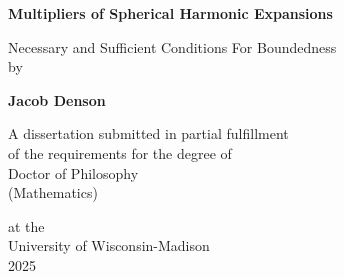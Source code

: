 \begin{titlepage}
    \begin{center}
        \vspace*{1cm}
        
        \Huge
        \textbf{Multipliers of Spherical Harmonic Expansions}
        
        \vspace{0.5cm}
        \LARGE
        {Necessary and Sufficient Conditions For Boundedness}%
        \vspace{1em}
        \\
        by\\
        \vspace{1em}
    
        \textbf{Jacob Denson}
        
        \vfill
        
        A dissertation submitted in partial fulfillment\\
        of the requirements for the degree of\\
        Doctor of Philosophy\\
        (Mathematics)\\
    
        
        \vspace{1.8cm}

        
        \Large
        at the\\University of Wisconsin-Madison\\
        2025\\
        \vspace{1.0cm}
        
    \end{center}
    
\end{titlepage}
